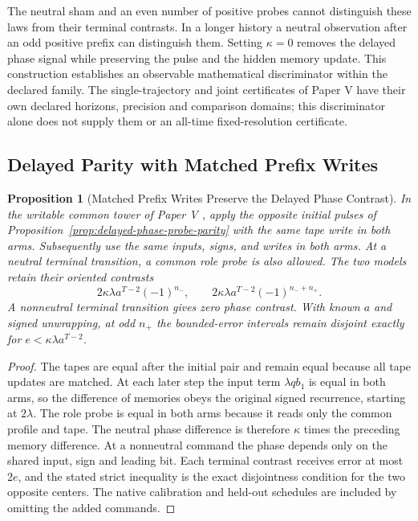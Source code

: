 \documentclass[11pt,a4paper]{article}
\newtheorem{proposition}{Proposition}[section]
\begin{document}
The neutral sham and an even number of positive probes cannot distinguish these laws from their terminal contrasts. In a longer history a neutral observation after an odd positive prefix can distinguish them. Setting $\kappa=0$ removes the delayed phase signal while preserving the pulse and the hidden memory update. This construction establishes an observable mathematical discriminator within the declared family. The single-trajectory and joint certificates of Paper V have their own
declared horizons, precision and comparison domains; this discriminator alone
does not supply them or an all-time fixed-resolution certificate.

\subsection{Delayed Parity with Matched Prefix Writes}

\begin{proposition}[Matched Prefix Writes Preserve the Delayed Phase Contrast]\label{prop:writable-tower-phase-parity}
In the writable common tower of Paper V \cite{paper5}, apply the opposite initial pulses of Proposition~\ref{prop:delayed-phase-probe-parity} with the same tape write in both arms. Subsequently use the same inputs, signs, and writes in both arms. At a neutral terminal transition, a common role probe is also allowed. The two models retain their oriented contrasts
\[
 2\kappa\lambda a^{T-2}(-1)^{n_-},
 \qquad
 2\kappa\lambda a^{T-2}(-1)^{n_-+n_+}.
\]
A nonneutral terminal transition gives zero phase contrast. With known $a$ and signed unwrapping, at odd $n_+$ the bounded-error intervals remain disjoint exactly for $e<\kappa\lambda a^{T-2}$.
\end{proposition}
\begin{proof}
The tapes are equal after the initial pair and remain equal because all tape updates are matched. At each later step the input term $\lambda q b_1$ is equal in both arms, so the difference of memories obeys the original signed recurrence, starting at $2\lambda$. The role probe is equal in both arms because it reads only the common profile and tape. The neutral phase difference is therefore $\kappa$ times the preceding memory difference. At a nonneutral command the phase depends only on the shared input, sign and leading bit. Each terminal contrast receives error at most $2e$, and the stated strict inequality is the exact disjointness condition for the two opposite centers. The native calibration and held-out schedules are included by omitting the added commands.
\end{proof}
\end{document}
